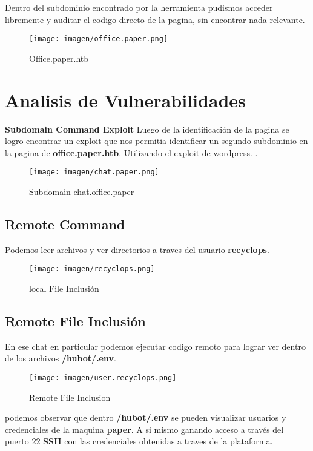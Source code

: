 \documentclass[a4paper]{article} %
\newcommand{\Maquina}{paper} %
\begin{document}
\clearpage
Dentro del subdominio encontrado por la herramienta pudismos acceder libremente y auditar el codigo directo de la pagina,
sin encontrar nada relevante.
\vspace{0.5cm}
\begin{figure}[h]
    \centering
    \texttt{[image: imagen/office.paper.png]}
    \caption{Office.paper.htb}
    
\end{figure}
\section{Analisis de Vulnerabilidades}
\vspace{0.1cm}
\textbf{Subdomain Command Exploit}
Luego de la identificación de la pagina se logro encontrar un exploit que nos permitia identificar un segundo subdominio
en la pagina de \textbf{office.paper.htb}. Utilizando el exploit de wordpress. \href{https://wpscan.com/vulnerability/3413b879-785f-4c9f-aa8a-5a4a1d5e0ba2}{\textbf{\color{blue}{Exploit}}}.
\vspace{0.5cm}
\begin{figure}[h]
    \centering
    \texttt{[image: imagen/chat.paper.png]}
    \caption{Subdomain chat.office.paper}    
\end{figure}
\clearpage
\subsection{Remote Command}
Podemos leer archivos y ver directorios  a traves del usuario \textbf{recyclops}.
\vspace{0.2cm}
\begin{figure}[h]
    \centering
    \texttt{[image: imagen/recyclops.png]}
    \caption{local File Inclusión}
    
\end{figure}
\clearpage
\subsection{Remote File Inclusión}
En ese chat en particular podemos ejecutar codigo remoto para lograr ver dentro de los archivos   \textbf{/hubot/.env}.
\vspace{0.2cm}
\begin{figure}[h]
    \centering
    \texttt{[image: imagen/user.recyclops.png]}
    \caption{Remote File Inclusion}
    
\end{figure}
\clearpage
podemos observar que dentro \textbf{/hubot/.env} se pueden visualizar usuarios y credenciales de la maquina \textbf{\Maquina}.
A si mismo ganando acceso a través del puerto 22 \textbf{SSH} con las credenciales obtenidas a traves de la plataforma.
\end{document}
